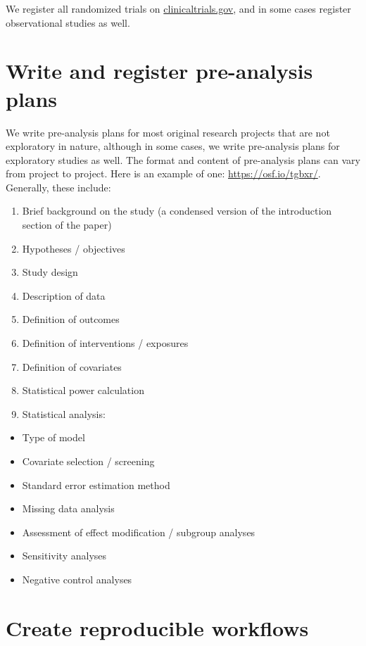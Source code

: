 \documentclass[
]{book}
\providecommand{\tightlist}{%
  \setlength{\itemsep}{0pt}\setlength{\parskip}{0pt}}
\begin{document}
We register all randomized trials on \url{clinicaltrials.gov}, and in some cases register observational studies as well.

\hypertarget{write-and-register-pre-analysis-plans}{%
\section{Write and register pre-analysis plans}\label{write-and-register-pre-analysis-plans}}

We write pre-analysis plans for most original research projects that are not exploratory in nature, although in some cases, we write pre-analysis plans for exploratory studies as well. The format and content of pre-analysis plans can vary from project to project. Here is an example of one: \url{https://osf.io/tgbxr/}. Generally, these include:

\begin{enumerate}
\def\labelenumi{\arabic{enumi}.}
\tightlist
\item
  Brief background on the study (a condensed version of the introduction section of the paper)
\item
  Hypotheses / objectives
\item
  Study design
\item
  Description of data
\item
  Definition of outcomes
\item
  Definition of interventions / exposures
\item
  Definition of covariates
\item
  Statistical power calculation
\item
  Statistical analysis:
\end{enumerate}

\begin{itemize}
\tightlist
\item
  Type of model
\item
  Covariate selection / screening
\item
  Standard error estimation method
\item
  Missing data analysis
\item
  Assessment of effect modification / subgroup analyses
\item
  Sensitivity analyses
\item
  Negative control analyses
\end{itemize}

\hypertarget{create-reproducible-workflows}{%
\section{Create reproducible workflows}\label{create-reproducible-workflows}}
\end{document}
